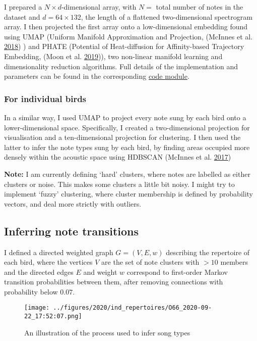 \documentclass[]{report}
\begin{document}
I prepared a \(N × d\)-dimensional array, with \(N =\) total number of
notes in the dataset and \(d = 64 × 132\), the length of a flattened
two-dimensional spectrogram array. I then projected the first array onto
a low-dimensional embedding found using UMAP (Uniform Manifold
Approximation and Projection, (McInnes et al.
\protect\hyperlink{ref-McInnes2018}{2018}) ) and PHATE (Potential of
Heat-diffusion for Affinity-based Trajectory Embedding, (Moon et al.
\protect\hyperlink{ref-Moon2019}{2019})), two non-linear manifold
learning and dimensionality reduction algorithms. Full details of the
implementation and parameters can be found in the corresponding
\protect\hyperlink{code-availability}{code module}.

\hypertarget{for-individual-birds}{%
\subsubsection{For individual birds}\label{for-individual-birds}}

In a similar way, I used UMAP to project every note sung by each bird
onto a lower-dimensional space. Specifically, I created a
two-dimensional projection for visualisation and a ten-dimensional
projection for clustering. I then used the latter to infer the note
types sung by each bird, by finding areas occupied more densely within
the acoustic space using HDBSCAN (McInnes et al.
\protect\hyperlink{ref-McInnes2017}{2017})

\textbf{Note:} I am currently defining `hard' clusters, where notes are
labelled as either clusters or noise. This makes some clusters a little
bit noisy. I might try to implement `fuzzy' clustering, where cluster
membership is defined by probability vectors, and deal more strictly
with outliers.

\hypertarget{inferring-note-transitions}{%
\subsection{Inferring note
transitions}\label{inferring-note-transitions}}

I defined a directed weighted graph \(G = (V, E, w)\) describing the
repertoire of each bird, where the vertices \(V\) are the set of note
clusters with \(> 10\) members and the directed edges \(E\) and weight
\(w\) correspond to first-order Markov transition probabilities between
them, after removing connections with probability below \(0.07\).

\begin{figure}
\centering
\texttt{[image: ../figures/2020/ind\_repertoires/O66\_2020-09-22\_17:52:07.png]}
\caption{An illustration of the process used to infer song types}
\end{figure}
\end{document}
